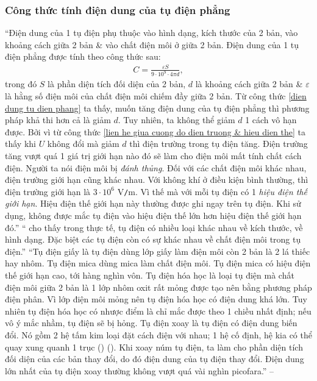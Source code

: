 \documentclass[oneside]{book}
\numberwithin{equation}{section}
\begin{document}
\subsubsection{Công thức tính điện dung của tụ điện phẳng}
``Điện dung của 1 tụ điện phụ thuộc vào hình dạng, kích thước của 2 bản, vào khoảng cách giữa 2 bản \& vào chất điện môi ở giữa 2 bản. Điện dung của 1 tụ điện phẳng được tính theo công thức sau:
\begin{align}
	\label{dien dung tu dien phang}
	C = \frac{\varepsilon S}{9\cdot 10^9\cdot 4\pi d},
\end{align}
trong đó $S$ là phần diện tích đối diện của 2 bản, $d$ là khoảng cách giữa 2 bản \& $\varepsilon$ là hằng số điện môi của chất điện môi chiếm đầy giữa 2 bản. Từ công thức \eqref{dien dung tu dien phang} ta thấy, muốn tăng điện dung của tụ điện phẳng thì phương pháp khả thi hơn cả là giảm $d$. Tuy nhiên, ta không thể giảm $d$ 1 cách vô hạn được. Bởi vì từ công thức \eqref{lien he giua cuong do dien truong & hieu dien the} ta thấy khi $U$ không đổi mà giảm $d$ thì điện trường trong tụ điện tăng. Điện trường tăng vượt quá 1 giá trị giới hạn nào đó sẽ làm cho điện môi mất tính chất cách điện. Người ta nói điện môi bị \textit{đánh thủng}. Đối với các chất điện môi khác nhau, điện trường giới hạn cũng khác nhau. Với không khí ở điều kiện bình thường, thì điện trường giới hạn là $3\cdot 10^6$ V\texttt{/}m. Vì thế mà với mỗi tụ điện có 1 \textit{hiệu điện thế giới hạn}. Hiệu điện thế giới hạn này thường được ghi ngay trên tụ điện. Khi sử dụng, không được mắc tụ điện vào hiệu điện thế lớn hơn hiệu điện thế giới hạn đó.'' ``\cite[Hình 7.3: \textsf{1 số tụ điện thường dùng}, p. 33]{SGK_Vat_Ly_11_nang_cao} cho thấy trong thực tế, tụ điện có nhiều loại khác nhau về kích thước, về hình dạng. Đặc biệt các tụ điện còn có sự khác nhau về chất điện môi trong tụ điện.'' ``Tụ điện giấy là tụ điện dùng lớp giấy làm điện môi còn 2 bản là 2 lá thiếc hay nhôm. Tụ điện mica dùng mica làm chất điện môi. Tụ điện mica có hiệu điện thế giới hạn cao, tới hàng nghìn vôn. Tụ điện hóa học là loại tụ điện mà chất điện môi giữa 2 bản là 1 lớp nhôm oxit rất mỏng được tạo nên bằng phương pháp điện phân. Vì lớp điện môi mỏng nên tụ điện hóa học có điện dung khá lớn. Tuy nhiên tụ điện hóa học có nhược điểm là chỉ mắc được theo 1 chiều nhất định; nếu vô ý mắc nhầm, tụ điện sẽ bị hỏng. Tụ điện xoay là tụ điện có điện dung biến đổi. Nó gồm 2 hệ tấm kim loại đặt cách điện với nhau; 1 hệ cố định, hệ kia có thể quay xung quanh 1 trục (\cite[Hình 7.4: \textsf{Tụ điện xoay}, p. 34]{SGK_Vat_Ly_11_nang_cao}) (\cite{SGK_Vat_Ly_11_nang_cao}). Khi xoay núm tụ điện, ta làm cho phần diện tích đối diện của các bản thay đổi, do đó điện dung của tụ điện thay đổi. Điện dung lớn nhất của tụ điện xoay thường không vượt quá vài nghìn picofara.'' -- \cite[pp. 33--34]{SGK_Vat_Ly_11_nang_cao}
\end{document}
